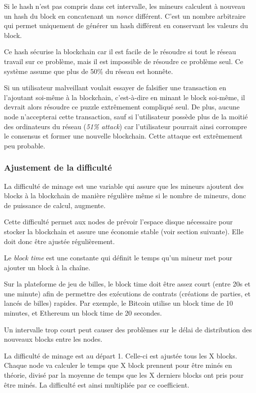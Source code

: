 \documentclass{article}
\begin{document}
Si le hash n'est pas compris dans cet intervalle, les mineurs calculent à nouveau un hash du block en concatenant un \textit{nonce} différent. C'est un nombre arbitraire qui permet uniquement de générer un hash différent en conservant les valeurs du block.

Ce hash sécurise la blockchain car il est facile de le résoudre si tout le réseau travail sur ce problème, mais il est impossible de résoudre ce problème seul. Ce système assume que plus de 50\% du réseau est honnête.

Si un utilisateur malveillant voulait essayer de falsifier une transaction en l'ajoutant soi-même à la blockchain, c'est-à-dire en minant le block soi-même, il devrait alors résoudre ce puzzle extrêmement compliqué seul. De plus, aucune node n'accepterai cette transaction, sauf si l'utilisateur possède plus de la moitié des ordinateurs du réseau (\textit{51\% attack}) car l'utilisateur pourrait ainsi corrompre le consensus et former une nouvelle blockchain.
Cette attaque est extrêmement peu probable.

\subsubsection{Ajustement de la difficulté}

La difficulté de minage est une variable qui assure que les mineurs ajoutent des blocks à la blockchain de manière régulière même si le nombre de mineurs, donc de puissance de calcul, augmente.
 
Cette difficulté permet aux nodes de prévoir l’espace disque nécessaire pour stocker la blockchain et assure une économie stable (voir section suivante). Elle doit donc être ajustée régulièrement.

Le \textit{block time} est une constante qui définit le temps qu’un mineur met pour ajouter un block à la chaîne.

Sur la plateforme de jeu de billes, le block time doit être assez court (entre 20s et une minute) afin de permettre des exécutions de contrats (créations de parties, et lancés de billes) rapides. Par exemple, le Bitcoin utilise un block time de 10 minutes, et Ethereum un block time de 20 secondes.

Un intervalle trop court peut causer des problèmes sur le délai de distribution des nouveaux blocks entre les nodes.

La difficulté de minage est au départ 1. Celle-ci est ajustée tous les X
blocks. Chaque node va calculer le temps que X block prennent pour être minés en théorie, divisé par la moyenne de temps que les X derniers blocks ont pris pour être minés. La difficulté est ainsi multipliée par ce coefficient.
\end{document}
